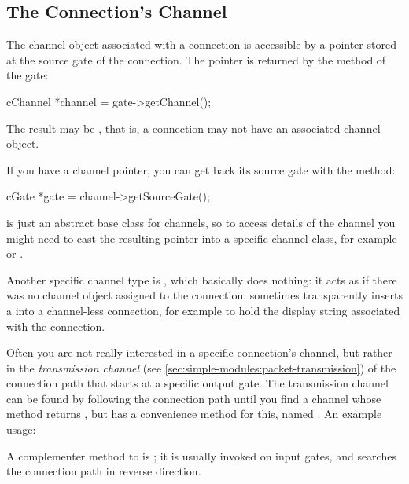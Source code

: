 \begin{ned}
\subsection{The Connection's Channel}
\label{sec:simple-modules:connections-channel}

The channel object associated with a connection is accessible by
a pointer stored at the source gate of the connection. The pointer
is returned by the  method of the gate:

\begin{cpp}
cChannel *channel = gate->getChannel();
\end{cpp}

The result may be , that is, a connection may not have
an associated channel object.

If you have a channel pointer, you can get back its source gate
with the  method:

\begin{cpp}
cGate *gate = channel->getSourceGate();
\end{cpp}

 is just an abstract base class for channels, so
to access details of the channel you might need to cast the resulting
pointer into a specific channel class, for example 
or .

Another specific channel type is , which basically
does nothing: it acts as if there was no channel object assigned to the
connection. {\opp} sometimes transparently inserts a 
into a channel-less connection, for example to hold the display string
associated with the connection.

Often you are not really interested in a specific connection's channel, but
rather in the \textit{transmission channel} (see
\ref{sec:simple-modules:packet-transmission}) of the connection path that
starts at a specific output gate. The transmission channel can be found by
following the connection path until you find a channel whose
 method returns , but
 has a convenience method for this, named
. An example usage:


A complementer method to  is
; it is usually invoked
on input gates, and searches the connection path in reverse direction.


\end{ned}
